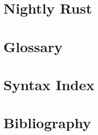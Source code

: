 \documentclass[fontsize=11pt,oneside]{scrbook}
\begin{document}
    \blankpage
    \chapter{Nightly Rust}
    \label{sec:nightly_rust}
    
    
    \blankpage
    \chapter{Glossary}
    \label{sec:glossary}
    
    
    \blankpage
    \chapter{Syntax Index}
    \label{sec:syntax_index}
    
    \blankpage
    \chapter{Bibliography}
    \label{sec:bib}
    
    
\end{document}
